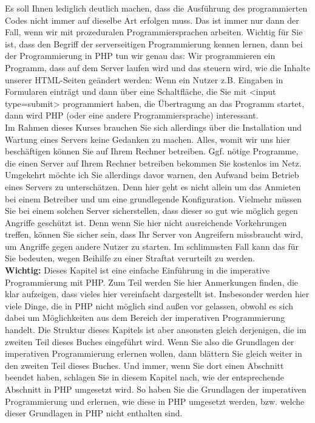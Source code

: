 Es soll Ihnen lediglich deutlich machen, dass die Ausführung des programmierten Codes nicht immer auf dieselbe Art erfolgen muss. Das ist immer nur dann der Fall, wenn wir mit prozeduralen Programmiersprachen arbeiten. Wichtig für Sie ist, dass den Begriff der serverseitigen Programmierung kennen lernen, dann bei der Programmierung in PHP tun wir genau das: Wir programmieren ein Programm, dass auf dem Server laufen wird und das steuern wird, wie die Inhalte unserer HTML-Seiten geändert werden: Wenn ein Nutzer z.B. Eingaben in Formularen einträgt und dann über eine Schaltfläche, die Sie mit <input type=submit> programmiert haben, die Übertragung an das Programm startet, dann wird PHP (oder eine andere Programmiersprache) interessant.\\


Im Rahmen dieses Kurses brauchen Sie sich allerdings über die Installation und Wartung eines Servers keine Gedanken zu machen. Alles, womit wir uns hier beschäftigen können Sie auf Ihrem Rechner betreiben. Ggf. nötige Programme, die einen Server auf Ihrem Rechner betreiben bekommen Sie kostenlos im Netz.\\


Umgekehrt möchte ich Sie allerdings davor warnen, den Aufwand beim Betrieb eines Servers zu unterschätzen. Denn hier geht es nicht allein um das Anmieten bei einem Betreiber und um eine grundlegende Konfiguration. Vielmehr müssen Sie bei einem solchen Server sicherstellen, dass dieser so gut wie möglich gegen Angriffe geschützt ist. Denn wenn Sie hier nicht ausreichende Vorkehrungen treffen, können Sie sicher sein, dass Ihr Server von Angreifern missbraucht wird, um Angriffe gegen andere Nutzer zu starten. Im schlimmsten Fall kann das für Sie bedeuten, wegen Beihilfe zu einer Straftat verurteilt zu werden.\\

\textbf{Wichtig:} Dieses Kapitel ist eine einfache Einführung in die imperative Programmierung mit PHP. Zum Teil werden Sie hier Anmerkungen finden, die klar aufzeigen, dass vieles hier vereinfacht dargestellt ist. Insbesonder werden hier viele Dinge, die in PHP nicht möglich sind außen vor gelassen, obwohl es sich dabei um Möglichkeiten aus dem Bereich der imperativen Programmierung handelt. Die Struktur dieses Kapitels ist aber ansonsten gleich derjenigen, die im zweiten Teil dieses Buches eingeführt wird. Wenn Sie also die Grundlagen der imperativen Programmierung erlernen wollen, dann blättern Sie gleich weiter in den zweiten Teil dieses Buches. Und immer, wenn Sie dort einen Abschnitt beendet haben, schlagen Sie in diesem Kapitel nach, wie der entsprechende Abschnitt in PHP umgesetzt wird. So haben Sie die Grundlagen der imperativen Programmierung und erlernen, wie diese in PHP umgesetzt werden, bzw. welche dieser Grundlagen in PHP nicht enthalten sind.\\

